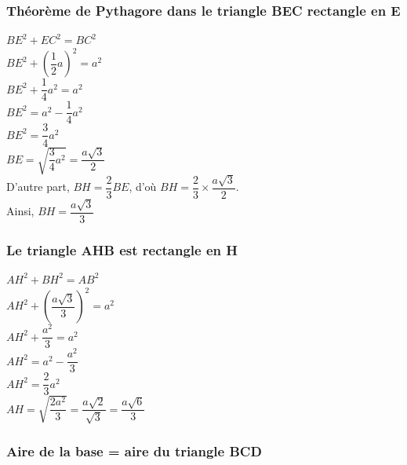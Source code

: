 \subsubsection*{Théorème de Pythagore dans le triangle BEC rectangle en E}

$ BE^2 + EC^2 = BC^2$ \\

$ BE^2 + \left(\dfrac{1}{2}a\right)^2 = a^2$ \\

$ BE^2 + \dfrac{1}{4}a^2 = a^2$ \\

$ BE^2 =a^2 - \dfrac{1}{4}a^2$ \\

$ BE^2 = \dfrac{3}{4}a^2 $ \\

$ BE = \sqrt{\dfrac{3}{4} a^2} = \dfrac{a\sqrt{3}}{2} $ \\

D'autre part, $ BH = \dfrac{2}{3} BE $, d'où $BH = \dfrac{2}{3} \times \dfrac{a\sqrt{3}}{2} $. \\

Ainsi, $BH = \dfrac{a\sqrt{3}}{3}$ \\

\newpage

\subsubsection*{Le triangle AHB est rectangle en H}

$ AH^2 + BH^2 = AB^2 $ \\

$ AH^2 + \left(\dfrac{a\sqrt{3}}{3}\right)^2 = a^2$ \\

$ AH^2 + \dfrac{a^2}{3} = a^2$ \\

$ AH^2 =a^2 - \dfrac{a^2}{3}$ \\

$ AH^2 = \dfrac{2}{3}a^2 $ \\

$ AH = \sqrt{\dfrac{2a^2}{3}} = \dfrac{a\sqrt{2}}{\sqrt{3}} = \dfrac{a\sqrt{6}}{3} $ \\

\subsubsection*{Aire de la base = aire du triangle BCD}

